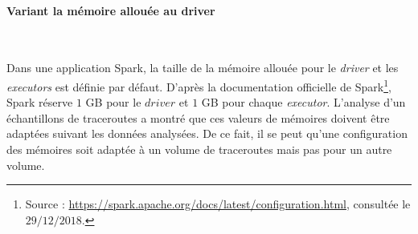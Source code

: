 \paragraph{Variant la mémoire allouée au driver}~

Dans une application Spark, la taille de la mémoire allouée pour le \textit{driver} et les \textit{executors} est  définie par défaut. D'après la documentation officielle de Spark\footnote{Source : \url{https://spark.apache.org/docs/latest/configuration.html}, consultée le $29/12/2018$.}, Spark réserve $ 1 $ GB pour le $ driver $ et $ 1 $ GB pour chaque \textit{executor}. 
L'analyse d'un échantillons de traceroutes  a montré que ces valeurs de mémoires doivent être adaptées suivant les données analysées. De ce fait, il se peut qu'une configuration des mémoires soit adaptée à un volume de traceroutes mais pas pour un autre volume. 



